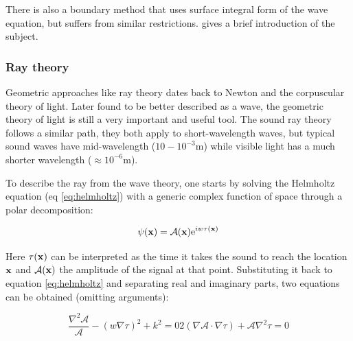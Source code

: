 There is also a boundary method that uses surface integral form of the wave
equation, but suffers from similar restrictions. \citet{funkhouser2003survey}
gives a brief introduction of the subject.

\subsubsection{Ray theory}
\label{sss:raytheory}

Geometric approaches like ray theory dates back to Newton and the corpuscular
theory of light. Later found to be better described as a wave, the geometric
theory of light is still a very important and useful tool. The sound ray theory
follows a similar path, they both apply to short-wavelength waves, but typical
sound waves have mid-wavelength ($10-10^{-3}$m) while visible light has a
much shorter wavelength ($\approx10^{-6}$m).

To describe the ray from the wave theory, one starts by solving the Helmholtz
equation (eq \ref{eq:helmholtz}) with a generic complex function of space
through a polar decomposition\cite{buckingham1992ocean,torres2007modeling}:

\begin{equation}
\label{eq:psi}
\psi(\mathrm{\mathbf{x}}) = \mathcal{A}(\mathrm{\mathbf{x}})\mathrm{e}^{iw\tau(\mathrm{\mathbf{x}})}
\end{equation}


Here $\tau(\mathrm{\mathbf{x}})$ can be interpreted as the time it takes the sound to
reach the location $\mathrm{\mathbf{x}}$ and $\mathcal{A}(\mathrm{\mathbf{x}})$ the amplitude of the
signal at that point. Substituting it back to equation \ref{eq:helmholtz} and
separating real and imaginary parts, two equations can be obtained (omitting
arguments):

\begin{subequations}
\begin{equation}
\label{eq:preeikonal}
\frac{\nabla^2\mathcal{A}}{\mathcal{A}} - (w\nabla \tau)^2 + k^2 = 0
\end{equation}

\begin{equation}
\label{eq:preeikonalamp}
2(\nabla\mathcal{A} \cdot \nabla \tau) + \mathcal{A}\nabla^2 \tau = 0
\end{equation}
\end{subequations}

